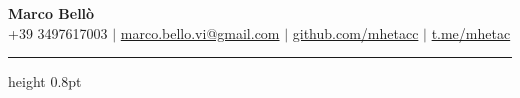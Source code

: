 \documentclass[12pt,a4paper,sans]{moderncv} %
\begin{document}
\begin{center}
    \textbf{\Huge Marco Bellò} \\ \vspace{5pt}
    \small \faMobile* +39 3497617003 \hspace{1pt} $|$
    \hspace{1pt} \faEnvelope \hspace{2pt} \href{mailto:marco.bello.vi@gmail.com}{marco.bello.vi@gmail.com} \hspace{1pt} $|$ 
    \hspace{1pt} \faGithub \hspace{2pt} \href{https://github.com/mhetacc}{github.com/mhetacc} \hspace{1pt} $|$
    \hspace{1pt} \faTelegram \hspace{2pt} \href{https://t.me/mhetac}{t.me/mhetac}
    \\ \vspace{-3pt}
\end{center}
\vspace{10pt} %

{\color{venetianred} \hrule height 0.8pt}

\vspace{10pt}
\end{document}
